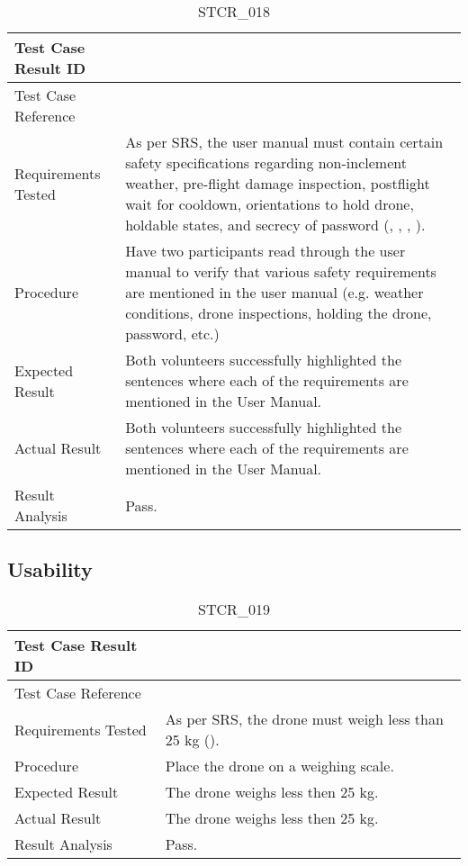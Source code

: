 \documentclass[12pt, titlepage]{article}
\begin{document}
\begin{table}[!h]
\begin{center}
\caption {STCR\_018}
\label{tab:STCR_018}
\begin{tabular}{ | m{3.2cm} | m{12.2cm} | } 
\hline
Test Case Result ID & \nameref{tab:STCR_018} \\ 
\hline
Test Case Reference & \nameref{tab:STC_018}  \\ 
\hline
Requirements Tested & As per SRS, the user manual must contain certain safety specifications regarding non-inclement weather, pre-flight damage inspection, postflight wait for cooldown, orientations to hold drone, holdable states, and secrecy of password (\nameref{SR_002}, \nameref{SR_006}, \nameref{SR_010}, \nameref{SAFE_003}). 
 \\ 
\hline
Procedure & Have two participants read through the user manual to verify that various safety requirements are mentioned in the user manual (e.g. weather conditions, drone inspections, holding the drone, password, etc.) \\
\hline
Expected Result & Both volunteers successfully highlighted the sentences where each of the requirements are mentioned in the User Manual.  \\ 
\hline
Actual Result &  Both volunteers successfully highlighted the sentences where each of the requirements are mentioned in the User Manual.  \\
\hline
Result Analysis & Pass.  \\ 
\hline
\end{tabular}
\end{center}
\end{table}

\clearpage

\subsection{Usability}

\begin{table}[!h]
\begin{center}
\caption {STCR\_019}
\label{tab:STCR_019}
\begin{tabular}{ | m{3.2cm} | m{12.2cm} | } 
\hline
Test Case Result ID & \nameref{tab:STCR_019} \\ 
\hline
Test Case Reference & \nameref{tab:STC_019}  \\ 
\hline
Requirements Tested & As per SRS, the drone must weigh less than 25 kg (\nameref{STD_001}).
 \\ 
\hline
Procedure & Place the drone on a weighing scale. \\
\hline
Expected Result & The drone weighs less then 25 kg.  \\ 
\hline
Actual Result &  The drone weighs less then 25 kg.  \\
\hline
Result Analysis & Pass.  \\ 
\hline
\end{tabular}
\end{center}
\end{table}
\end{document}
